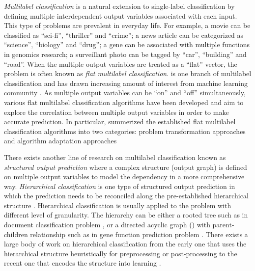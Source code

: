 \textit{Multilabel classification} is a natural extension to single-label classification by defining multiple interdependent output variables associated with each input.
This type of problems are prevalent in everyday life.
For example, a movie can be classified as ``sci-fi'', ``thriller'' and ``crime''; a news article can be categorized as ``science'', ``biology'' and ``drug''; a gene can be associated with multiple functions in genomics research; a surveillant photo can be tagged by ``car'', ``building'' and ``road''. 
When the multiple output variables are treated as a ``flat'' vector, the problem is often known as \textit{flat multilabel classification}.
 is one branch of multilabel classification and has drawn increasing amount of interest from machine learning community \citep{Tsoumakas07multi,Tsoumakas10mining}.
As multiple output variables can be ``on'' and ``off'' simultaneously, various flat multilabel classification algorithms have been developed and aim to explore the correlation between multiple output variables in order to make accurate prediction.
In particular, \citet{Tsoumakas07multi} summerized the established flat multilabel classification algorithms into two categories: problem transformation approaches \citep{Zhang05a,Read09classifier,Cheng09combining} and algorithm adaptation approaches \citep{Schapire99improved,Bian12corrlog}


There exists another line of research on multilabel classification known as \textit{structured output prediction} where a complex structure (output graph) is defined on multiple output variables to model the dependency in a more comprehensive way.
\textit{Hierarchical classification} is one type of structured output prediction in which the prediction needs to be reconciled along the pre-established hierarchical structure \citep{Silla11a}.
Hierarchical classification is usually applied to the problem with different level of granularity. 
The hierarchy can be either a rooted tree such as in document classification problem \citep{Hao07hierarchicaly,Li07hierarchical,Rousu06}, or a directed acyclic graph (\daggraph) with parent-children relationship such as in gene function prediction problem \citep{Barutcuoglu06hierarchical}.
There exists a large body of work on hierarchical classification from the early one that uses the hierarchical structure heuristically for preprocessing or post-processing \citep{Koller97hierarchically,Dumais00Hierarchical,Liu05support,DeCoro07bayesian} to the recent one that encodes the structure into learning \citep{Cai04hierarchical,Cesabianchi05incremental,Rousu06,Gopal12bayesian}.

